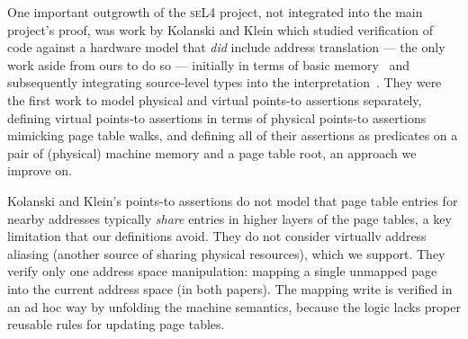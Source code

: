 
One important outgrowth of the \textsc{seL4} project, not integrated into the main project's proof, was work by Kolanski and Klein which studied verification of code against a hardware model that \emph{did} include address translation --- the only work aside from ours to do so --- initially in terms of basic memory~\cite{kolanski08vstte} and subsequently integrating source-level types into the interpretation~\cite{kolanski09tphols}. 
They were the first work to model physical and virtual points-to assertions separately, defining virtual points-to assertions in terms of physical points-to assertions mimicking page table walks, and defining all of their assertions as predicates on a pair of (physical) machine memory and a page table root, an approach we improve on.

Kolanski and Klein's points-to assertions do not model that page table entries for nearby addresses typically \emph{share} entries in higher layers of the page tables, a key limitation that our definitions avoid.
They do not consider virtuallv address aliasing (another source of sharing physical resources), which we support.
They verify only one address space manipulation: mapping a single unmapped page into the current address space (in both papers).
The mapping write is verified in an ad hoc way by unfolding the machine semantics, because the logic lacks proper reusable rules for
updating page tables.

